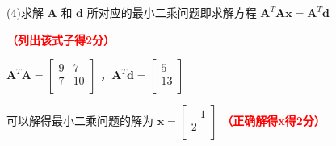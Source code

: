 \documentclass[12pt,a4paper,openany,twoside]{ctexbook}
\begin{document}
\begin{Solution}
	(4)求解 $\mathbf{A}$ 和 $\mathbf{d}$ 所对应的最小二乘问题即求解方程 $\mathbf{A}^T\mathbf{A}\mathbf{x}=\mathbf{A}^T\mathbf{d}$
	
	\hfill \textcolor{red}{\textbf{（列出该式子得2分）}}

	$\mathbf{A}^T\mathbf{A}=\begin{bmatrix}  
	9 & 7  \\  
	7 & 10 \\
	\end{bmatrix}$ ，$\mathbf{A}^T\mathbf{d}=\begin{bmatrix}  
	5  \\  
	13 \\
	\end{bmatrix}$
	
	可以解得最小二乘问题的解为 $\mathbf{x}=\begin{bmatrix}  
	-1  \\  
	2 \\
	\end{bmatrix}$
	\hfill \textcolor{red}{\textbf{（正确解得x得2分）}}
\end{Solution}
\end{document}
